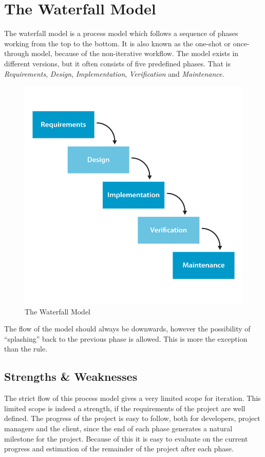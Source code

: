 \documentclass[../report.tex]{subfiles}
\begin{document}
\graphicspath{{img/}{../img/}}

\section{The Waterfall Model}

The waterfall model is a process model which follows a sequence of phases working from the top to the bottom. It is also known as the one-shot or once-through model, because of the non-iterative workflow. The model exists in different versions, but it often consists of five predefined phases. That is \textit{Requirements}, \textit{Design}, \textit{Implementation}, \textit{Verification} and \textit{Maintenance}.

\begin{figure}[H]
\centering
	\includegraphics[scale=0.3]{h4_waterfall.jpg}
\caption{The Waterfall Model}
\end{figure}

The flow of the model should always be downwards, however the possibility of ``splashing'' back to the previous phase is allowed. This is more the exception than the rule.

\subsection{Strengths \& Weaknesses}
The strict flow of this process model gives a very limited scope for iteration. This limited scope is indeed a strength, if the requirements of the project are well defined. The progress of the project is easy to follow, both for developers, project managers and the client, since the end of each phase generates a natural milestone for the project. Because of this it is easy to evaluate on the current progress and estimation of the remainder of the project after each phase.
\end{document}

